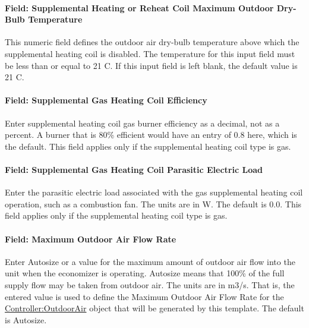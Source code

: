 \paragraph{Field: Supplemental Heating or Reheat Coil Maximum Outdoor Dry-Bulb Temperature}\label{field-supplemental-heating-or-reheat-coil-maximum-outdoor-dry-bulb-temperature}

This numeric field defines the outdoor air dry-bulb temperature above which the supplemental heating coil is disabled. The temperature for this input field must be less than or equal to 21 C. If this input field is left blank, the default value is 21 C.

\paragraph{Field: Supplemental Gas Heating Coil Efficiency}\label{field-supplemental-gas-heating-coil-efficiency-2}

Enter supplemental heating coil gas burner efficiency as a decimal, not as a percent. A burner that is 80\% efficient would have an entry of 0.8 here, which is the default. This field applies only if the supplemental heating coil type is gas.

\paragraph{Field: Supplemental Gas Heating Coil Parasitic Electric Load}\label{field-supplemental-gas-heating-coil-parasitic-electric-load-2}

Enter the parasitic electric load associated with the gas supplemental heating coil operation, such as a combustion fan. The units are in W. The default is 0.0. This field applies only if the supplemental heating coil type is gas.

\paragraph{Field: Maximum Outdoor Air Flow Rate}\label{field-maximum-outdoor-air-flow-rate-2}

Enter Autosize or a value for the maximum amount of outdoor air flow into the unit when the economizer is operating. Autosize means that 100\% of the full supply flow may be taken from outdoor air. The units are in m3/s. That is, the entered value is used to define the Maximum Outdoor Air Flow Rate for the \hyperref[controlleroutdoorair]{Controller:OutdoorAir} object that will be generated by this template. The default is Autosize.

